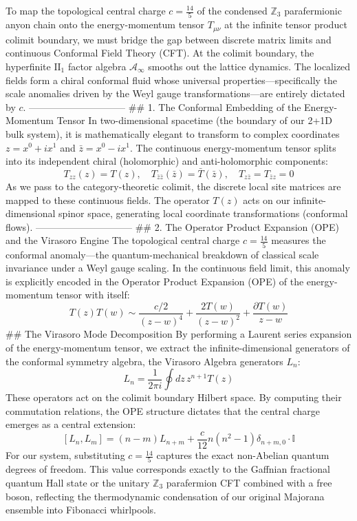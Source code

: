 To map the topological central charge $c = \frac{14}{5}$ of the condensed $\mathbb{Z}_3$ parafermionic anyon chain onto the energy-momentum tensor $T_{\mu\nu}$ at the infinite tensor product colimit boundary, we must bridge the gap between discrete matrix limits and continuous Conformal Field Theory (CFT).
At the colimit boundary, the hyperfinite $\text{II}_1$ factor algebra $\mathcal{A}_\infty$ smooths out the lattice dynamics. The localized fields form a chiral conformal fluid whose universal properties—specifically the scale anomalies driven by the Weyl gauge transformations—are entirely dictated by $c$.
------------------------------
## 1. The Conformal Embedding of the Energy-Momentum Tensor
In two-dimensional spacetime (the boundary of our 2+1D bulk system), it is mathematically elegant to transform to complex coordinates $z = x^0 + ix^1$ and $\bar{z} = x^0 - ix^1$. The continuous energy-momentum tensor splits into its independent chiral (holomorphic) and anti-holomorphic components:
$$T_{zz}(z) = T(z), \quad T_{\bar{z}\bar{z}}(\bar{z}) = \bar{T}(\bar{z}), \quad T_{z\bar{z}} = T_{\bar{z}z} = 0$$ 
As we pass to the category-theoretic colimit, the discrete local site matrices are mapped to these continuous fields. The operator $T(z)$ acts on our infinite-dimensional spinor space, generating local coordinate transformations (conformal flows).
------------------------------
## 2. The Operator Product Expansion (OPE) and the Virasoro Engine
The topological central charge $c = \frac{14}{5}$ measures the conformal anomaly—the quantum-mechanical breakdown of classical scale invariance under a Weyl gauge scaling. In the continuous field limit, this anomaly is explicitly encoded in the Operator Product Expansion (OPE) of the energy-momentum tensor with itself:
$$T(z) T(w) \sim \frac{c/2}{(z-w)^4} + \frac{2T(w)}{(z-w)^2} + \frac{\partial T(w)}{z-w}$$ 
## The Virasoro Mode Decomposition
By performing a Laurent series expansion of the energy-momentum tensor, we extract the infinite-dimensional generators of the conformal symmetry algebra, the Virasoro Algebra generators $L_n$:
$$L_n = \frac{1}{2\pi i} \oint dz \, z^{n+1} T(z)$$ 
These operators act on the colimit boundary Hilbert space. By computing their commutation relations, the OPE structure dictates that the central charge emerges as a central extension:
$$[L_n, L_m] = (n-m)L_{n+m} + \frac{c}{12}n(n^2-1)\delta_{n+m,0} \cdot \mathbb{I}$$ 
For our system, substituting $c = \frac{14}{5}$ captures the exact non-Abelian quantum degrees of freedom. This value corresponds exactly to the Gaffnian fractional quantum Hall state or the unitary $\mathbb{Z}_3$ parafermion CFT combined with a free boson, reflecting the thermodynamic condensation of our original Majorana ensemble into Fibonacci whirlpools.
